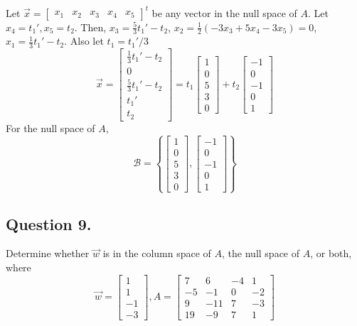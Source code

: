 \documentclass{article}
\begin{document}
Let $\Vec{x}=[\begin{array}{ccccc}x_1&x_2&x_3&x_4&x_5\end{array}]^t$ be any vector in the null space of $A$.
Let $x_4=t_1',x_5=t_2$. Then, $x_3=\frac{5}{3}t_1'-t_2$, $x_2=\frac{1}{2}(-3x_3+5x_4-3x_5)=0$, $x_1=\frac{1}{3}t_1'-t_2$. Also let $t_1=t_1'/3$
\[\Vec{x}=\left[\begin{array}{r}\frac{1}{3}t_1'-t_2\\0\\\frac{5}{3}t_1'-t_2\\t_1'\\t_2\end{array}\right]=t_1\left[\begin{array}{r}1\\0\\5\\3\\0\end{array}\right]+t_2\left[\begin{array}{r}-1\\0\\-1\\0\\1\end{array}\right]\]
For the null space of $A$,
\[\mathcal{B}=\left\{\left[\begin{array}{r}1\\0\\5\\3\\0\end{array}\right],\left[\begin{array}{r}-1\\0\\-1\\0\\1\end{array}\right]\right\}\]
\subsection*{Question 9.}
Determine whether $\Vec{w}$ is in the column space of $A$, the null space of $A$, or both, where 
\[\Vec{w}=\left[\begin{array}{r}1\\1\\-1\\-3\end{array}\right], A=\left[\begin{array}{rrrr}7&6&-4&1\\-5&-1&0&-2\\9&-11&7&-3\\19&-9&7&1\end{array}\right]\]
\end{document}
